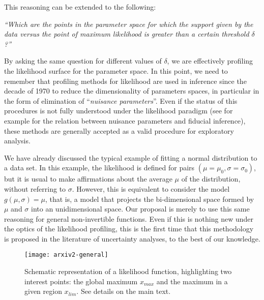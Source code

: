\documentclass[twoside,12pt,a4paper]{article}
\begin{document}
This reasoning can be extended to the following:

{\em ``Which are the points in the parameter space for which the support given by the data 
{\em versus} the point of maximum likelihood is greater than a certain threshold $\delta$?''}

By asking the same question for different values of $\delta$, we are effectively profiling the 
likelihood surface for the parameter space. In this point, we need to remember that profiling 
methods for likelihood are used in inference since the decade of 1970 to reduce the dimensionality
of parameters spaces, in particular in the form of elimination of ``{\em nuisance parameters}''.
Even if the status of this procedures is not fully understood under the likelihood
paradigm (see for example \citep{Kalbfleisch70} for the relation between nuisance parameters and fiducial
inference), these methods are generally accepted as a valid procedure for exploratory analysis.

We have already discussed the typical example of fitting a normal distribution to a data set. In
this example, the likelihood is defined for pairs $(\mu = \mu_0, \sigma = \sigma_0)$,
but it is usual to make affirmations about the average $\mu$ of the distribution, without 
referring to $\sigma$.
However, this is equivalent to consider the model $g(\mu, \sigma) = \mu$, that is, a model that
projects the bi-dimensional space formed by $\mu$ and $\sigma$ into an unidimensional space. Our proposal
is merely to use this same reasoning for general non-invertible functions. Even if this is nothing
new under the optics of the likelihood profiling, this is the first time that this methodology is proposed
in the literature of uncertainty analyses, to the best of our knowledge.

\begin{figure}[htb]
\texttt{[image: arxiv2-general]}
	\caption{Schematic representation of a likelihood function, highlighting two interest points: the
  global maximum $x_{max}$ and the maximum in a given region $x_{lim}$. See details on the main text.} 
	\label{fig:esquema}
\end{figure}
\end{document}
